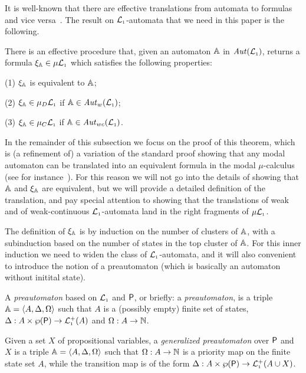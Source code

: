 
\newcommand{\ytr}{\mathtt{tr}}

It is well-known that there are effective translations from automata to formulas
and vice versa~\cite{xxxx}.
The result on $\mathcal{L}_{\scriptscriptstyle 1}$-automata that we need in this paper is the following.

\begin{theorem}\label{t:autofor}
There is an effective procedure that, given an automaton $\mathbb{A}$ in 
$\mathit{Aut}(\mathcal{L}_{\scriptscriptstyle 1})$, returns a formula $\xi_{\mathbb{A}} \in \mu\mathcal{L}_{\scriptscriptstyle 1}$ which satisfies
the following properties:

(1) $\xi_{\mathbb{A}}$ is equivalent to $\mathbb{A}$;

(2) $\xi_{\mathbb{A}} \in \mu_{D}\mathcal{L}_{\scriptscriptstyle 1}$ if $\mathbb{A} \in \mathit{Aut}_{w}(\mathcal{L}_{\scriptscriptstyle 1})$;

(3) $\xi_{\mathbb{A}} \in \mu_{C}\mathcal{L}_{\scriptscriptstyle 1}$ if $\mathbb{A} \in \mathit{Aut}_{wc}(\mathcal{L}_{\scriptscriptstyle 1})$.
\end{theorem}

In the remainder of this subsection
we focus on the proof of this theorem, which is (a refinement of)
a variation of the standard proof showing that any modal automaton can be 
translated into an equivalent formula in the modal $\mu$-calculus (see for
instance~\cite[Section 6]{Ven08}). 
For this reason we will not go into the details of showing that $\mathbb{A}$ and 
$\xi_{\mathbb{A}}$ are equivalent, but we will provide a detailed definition of the 
translation, and pay special attention to showing that the translations of weak
and of weak-continuous $\mathcal{L}_{\scriptscriptstyle 1}$-automata land in the right fragments of 
$\mu\mathcal{L}_{\scriptscriptstyle 1}$. 

The definition of $\xi_{\mathbb{A}}$ is by induction on the number of clusters of
$\mathbb{A}$, with a subinduction based on the number of states in the top cluster 
of $\mathbb{A}$.
For this inner induction we need to widen the class of $\mathcal{L}_{\scriptscriptstyle 1}$-automata, and
it will also convenient to introduce the notion of a preautomaton (which is  
basically an automaton without initital state).

\begin{definition}
A \emph{preautomaton} based on $\mathcal{L}_{\scriptscriptstyle 1}$ and $\mathsf{P}$, or briefly: a
\emph{preautomaton}, is a triple $\mathbb{A} = \langle{A,\Delta,\Omega}\rangle$ such that $A$ is
a (possibly empty) finite set of states, $\Delta: A\times \wp(\mathsf{P}) \to 
\mathcal{L}_{\scriptscriptstyle 1}^+(A)$ and $\Omega: A \to \mathbb{N}$.

Given a set $X$ of propositional variables, a \emph{generalized preautomaton} 
over $\mathsf{P}$ and $X$ is a triple $\mathbb{A} = \langle{A,\Delta,\Omega}\rangle$ such that $\Omega:
A \to \mathbb{N}$ is a priority map on the finite state set $A$, while the transition 
map is of the form $\Delta: A\times \wp(\mathsf{P}) \to \mathcal{L}_{\scriptscriptstyle 1}^+(A\cup X)$.
\end{definition}

